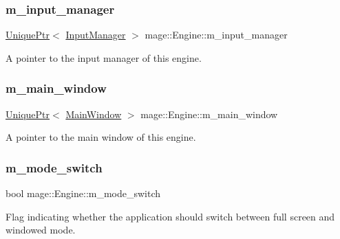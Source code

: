 \subsubsection{\texorpdfstring{m\+\_\+input\+\_\+manager}{m\_input\_manager}}
{\footnotesize\ttfamily \hyperlink{namespacemage_a3316d7143a973e37adf1110f2e80ca31}{Unique\+Ptr}$<$ \hyperlink{classmage_1_1_input_manager}{Input\+Manager} $>$ mage\+::\+Engine\+::m\+\_\+input\+\_\+manager\hspace{0.3cm}{\ttfamily [private]}}

A pointer to the input manager of this engine. \hypertarget{classmage_1_1_engine_a3aea7e8c0c1247cac570334a3d3543d6}{}\label{classmage_1_1_engine_a3aea7e8c0c1247cac570334a3d3543d6} 
\subsubsection{\texorpdfstring{m\+\_\+main\+\_\+window}{m\_main\_window}}
{\footnotesize\ttfamily \hyperlink{namespacemage_a3316d7143a973e37adf1110f2e80ca31}{Unique\+Ptr}$<$ \hyperlink{classmage_1_1_main_window}{Main\+Window} $>$ mage\+::\+Engine\+::m\+\_\+main\+\_\+window\hspace{0.3cm}{\ttfamily [private]}}

A pointer to the main window of this engine. \hypertarget{classmage_1_1_engine_aa5cb2e0b7bb2c4a9020e79ab832ee221}{}\label{classmage_1_1_engine_aa5cb2e0b7bb2c4a9020e79ab832ee221} 
\subsubsection{\texorpdfstring{m\+\_\+mode\+\_\+switch}{m\_mode\_switch}}
{\footnotesize\ttfamily bool mage\+::\+Engine\+::m\+\_\+mode\+\_\+switch\hspace{0.3cm}{\ttfamily [private]}}

Flag indicating whether the application should switch between full screen and windowed mode. \hypertarget{classmage_1_1_engine_a81c7475c3501f84f9bd9c7bbeaebfcb6}{}\label{classmage_1_1_engine_a81c7475c3501f84f9bd9c7bbeaebfcb6} 

